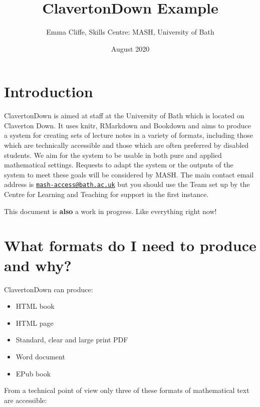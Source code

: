 \documentclass[
  12pt,
  a4paper]{extarticle}
\title{ClavertonDown Example}
\author{Emma Cliffe, Skills Centre: MASH, University of Bath}
\date{August 2020}
\providecommand{\tightlist}{%
  \setlength{\itemsep}{0pt}\setlength{\parskip}{0pt}}
\theoremstyle{plain}
\theoremstyle{definition}
\theoremstyle{plain}
\theoremstyle{plain}
\theoremstyle{plain}
\theoremstyle{plain}
\theoremstyle{definition}
\theoremstyle{definition}
\theoremstyle{remark}
\theoremstyle{remark}
\renewcommand{\;}{\,}
\begin{document}
\maketitle

{
\setcounter{tocdepth}{2}
\tableofcontents
}
\newpage
{}

\hypertarget{introduction}{%
\section*{Introduction}\label{introduction}}

ClavertonDown is aimed at staff at the University of Bath which is located on Claverton Down. It uses knitr, RMarkdown and Bookdown and aims to produce a system for creating sets of lecture notes in a variety of formats, including those which are technically accessible and those which are often preferred by disabled students. We aim for the system to be usable in both pure and applied mathematical settings. Requests to adapt the system or the outputs of the system to meet these goals will be considered by MASH. The main contact email address is \href{mailto:mash-access@bath.ac.uk}{\nolinkurl{mash-access@bath.ac.uk}} but you should use the Team set up by the Centre for Learning and Teaching for support in the first instance.

This document is \textbf{also} a work in progress. Like everything right now!

\hypertarget{what-formats-do-i-need-to-produce-and-why}{%
\section{What formats do I need to produce and why?}\label{what-formats-do-i-need-to-produce-and-why}}

ClavertonDown can produce:

\begin{itemize}
\tightlist
\item
  HTML book
\item
  HTML page
\item
  Standard, clear and large print PDF
\item
  Word document
\item
  EPub book
\end{itemize}

From a technical point of view only three of these formats of mathematical text are accessible:
\end{document}
